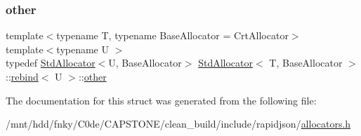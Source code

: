 \subsubsection{\texorpdfstring{other}{other}}
{\footnotesize\ttfamily template$<$typename T, typename Base\+Allocator = Crt\+Allocator$>$ \\
template$<$typename U $>$ \\
typedef \hyperlink{classStdAllocator}{Std\+Allocator}$<$U, Base\+Allocator$>$ \hyperlink{classStdAllocator}{Std\+Allocator}$<$ T, Base\+Allocator $>$\+::\hyperlink{structStdAllocator_1_1rebind}{rebind}$<$ U $>$\+::\hyperlink{structStdAllocator_1_1rebind_ad1492f350e2dec2087141aa68b390792}{other}}



The documentation for this struct was generated from the following file\+:\begin{DoxyCompactItemize}
\item 
/mnt/hdd/fnky/\+C0de/\+C\+A\+P\+S\+T\+O\+N\+E/clean\+\_\+build/include/rapidjson/\hyperlink{allocators_8h}{allocators.\+h}\end{DoxyCompactItemize}
